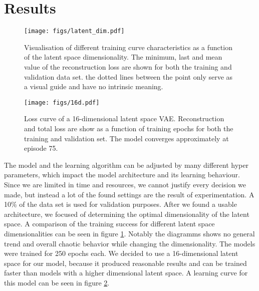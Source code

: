 \documentclass[journal]{Imperial_lab_report}
\begin{document}
\section{Results}
\begin{figure} [t]
    \centering
    \texttt{[image: figs/latent\_dim.pdf]}
    \caption{Visualisation of different training curve characteristics as a function of the latent space dimensionality. The minimum, last and mean value of the reconstruction loss are shown for both the training and validation data set. the dotted lines between the point only serve as a visual guide and have no intrinsic meaning.}
    \label{fig:latentdim}
\end{figure}
\begin{figure}
    \centering
    \texttt{[image: figs/16d.pdf]}
    \caption{Loss curve of a 16-dimensional latent space VAE. Reconstruction and total loss are show as a function of training epochs for both the training and validation set. The model converges approximately at episode 75.}
    \label{fig:16d}
\end{figure}
The model and the learning algorithm can be adjusted by many different hyper parameters, which impact the model architecture and its learning behaviour. Since we are limited in time and resources, we cannot justify every decision we made, but instead a lot of the found settings are the result of experimentation. A 10\% of the data set is used for validation purposes. After we found a usable architecture, we focused of determining the optimal dimensionality of the latent space. A comparison of the training success for different latent space dimensionalities can be seen in figure \ref{fig:latentdim}. Notably the diagramms shows no general trend and overall chaotic behavior while changing the dimensionality. The models were trained for 250 epochs each. We decided to use a 16-dimensional latent space for our model, because it produced reasonable results and can be trained faster than models with a higher dimensional latent space. A learning curve for this model can be seen in figure \ref{fig:16d}.
\end{document}
